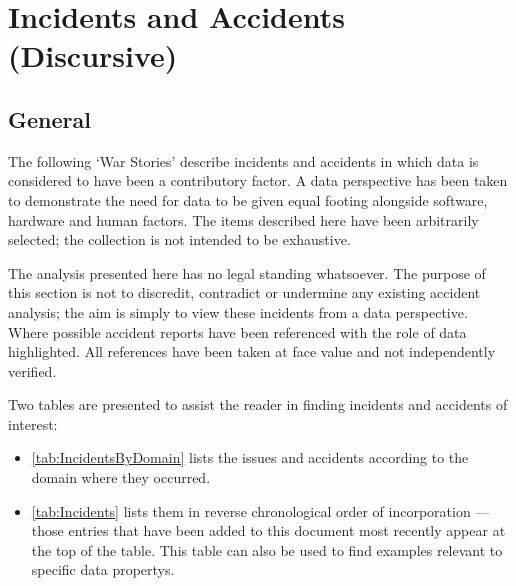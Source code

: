 %
%
\section{Incidents and Accidents (Discursive)} \label{bkm:accidents}


\subsection{General}
The following `War Stories' describe incidents and accidents in which data is considered to have been a contributory factor. A data perspective has been taken to demonstrate the need for data to be given equal footing alongside software, hardware and human factors. The items described here have been arbitrarily selected; the collection is not intended to be exhaustive.

 The analysis presented here has no legal standing whatsoever. The purpose of this section is not to discredit, contradict or undermine any existing accident analysis; the aim is simply to view these incidents from a data perspective. Where possible accident reports have been referenced with the role of data highlighted. All references have been taken at face value and not independently verified.

Two tables are presented to assist the reader in finding incidents and accidents of interest:
\begin{itemize}
\item \autoref{tab:IncidentsByDomain} lists the issues and accidents according to the domain where
  they occurred.
\item \autoref{tab:Incidents} lists them in reverse chronological order of incorporation --- those entries that have been added to this document most recently appear at the top of the table.
  This table can also be used to find examples relevant to specific \glspl{data property}.
\end{itemize}

